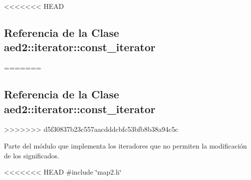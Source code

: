 <<<<<<< HEAD
\hypertarget{classaed2_1_1iterator_1_1const__iterator}{\subsection{\-Referencia de la \-Clase aed2\-:\-:iterator\-:\-:const\-\_\-iterator}
\label{classaed2_1_1iterator_1_1const__iterator}
}
=======
\hypertarget{classaed2_1_1iterator_1_1const__iterator}{}\subsection{Referencia de la Clase aed2\+:\+:iterator\+:\+:const\+\_\+iterator}
\label{classaed2_1_1iterator_1_1const__iterator}
>>>>>>> d5f30837b23c557aacdddcbfc53bfb8b38a94c5c


Parte del módulo que implementa los iteradores que no permiten la modificación de los significados.  




<<<<<<< HEAD
{\ttfamily \#include \char`\"{}map2.\-h\char`\"{}}


